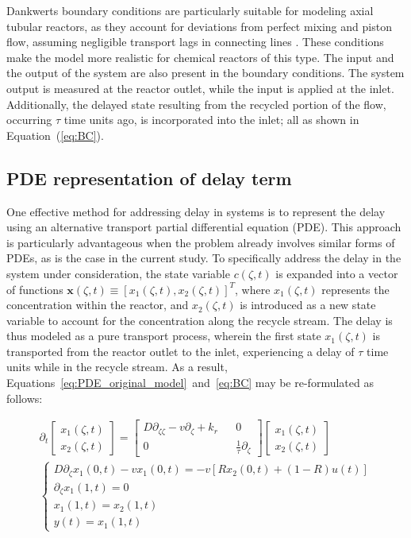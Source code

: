 Dankwerts boundary conditions are particularly suitable for modeling axial tubular reactors, as they account for deviations from perfect mixing and piston flow, assuming negligible transport lags in connecting lines \autocite{danckwerts1993continuous}. These conditions make the model more realistic for chemical reactors of this type. The input and the output of the system are also present in the boundary conditions. The system output is measured at the reactor outlet, while the input is applied at the inlet. Additionally, the delayed state resulting from the recycled portion of the flow, occurring $\tau$ time units ago, is incorporated into the inlet; all as shown in Equation~(\ref{eq:BC}).


\subsection{PDE representation of delay term}

One effective method for addressing delay in systems is to represent the delay using an alternative transport partial differential equation (PDE). This approach is particularly advantageous when the problem already involves similar forms of PDEs, as is the case in the current study. To specifically address the delay in the system under consideration, the state variable $c(\zeta, t)$ is expanded into a vector of functions $\bm{x}(\zeta, t) \equiv [x_1(\zeta, t), x_2(\zeta, t)]^T$, where $x_1(\zeta, t)$ represents the concentration within the reactor, and $x_2(\zeta, t)$ is introduced as a new state variable to account for the concentration along the recycle stream. The delay is thus modeled as a pure transport process, wherein the first state $x_1(\zeta, t)$ is transported from the reactor outlet to the inlet, experiencing a delay of $\tau$ time units while in the recycle stream. As a result, Equations~\ref{eq:PDE_original_model}~and~\ref{eq:BC} may be re-formulated as follows:

\begin{align}
    \partial_t 
    \begin{bmatrix}
        x_1(\zeta, t) \\ x_2(\zeta,t)
    \end{bmatrix}
    =
    \begin{bmatrix}
        D \partial_{\zeta \zeta} - v \partial_\zeta + k_r && 0 \\
        0 && \frac{1}{\tau} \partial_\zeta
    \end{bmatrix}
    \begin{bmatrix}
        x_1(\zeta, t) \\ x_2(\zeta,t)
    \end{bmatrix}\\
\begin{cases}
    D \partial_\zeta x_1(0, t) - v x_1(0, t) = -v \left[ R x_2(0, t) + (1-R) u(t) \right] \\
    \partial_\zeta x_1(1, t) = 0 \\
    x_1(1,t) = x_2(1,t) \\
    y(t) = x_1(1, t)
\end{cases}
\end{align}


